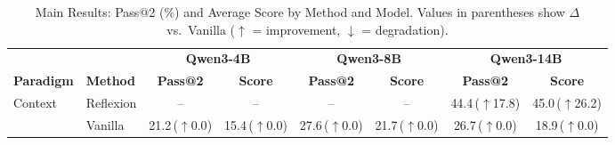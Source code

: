 \begin{table}[t]
  \centering
  \small
  \caption{Main Results: Pass@2 (\%) and Average Score by Method and Model. Values in parentheses show $\Delta$ vs.\ Vanilla ($\uparrow$ = improvement, $\downarrow$ = degradation).}
  \label{tab:main_results}
  \begin{tabular}{llcccccc}
  \toprule
  & & \multicolumn{2}{c}{\textbf{Qwen3-4B}} & \multicolumn{2}{c}{\textbf{Qwen3-8B}} & \multicolumn{2}{c}{\textbf{Qwen3-14B}} \\
  \cmidrule(lr){3-4} \cmidrule(lr){5-6} \cmidrule(lr){7-8}
  \textbf{Paradigm} & \textbf{Method} & \textbf{Pass@2} & \textbf{Score} & \textbf{Pass@2} & \textbf{Score} & \textbf{Pass@2} & \textbf{Score} \\
  \midrule
  \multirow{2}{*}{Context} & Reflexion & -- & -- & -- & -- & \cellcolor[HTML]{4284B9}44.4\,({\scriptsize $\uparrow$17.8}) & \cellcolor[HTML]{4083B8}45.0\,({\scriptsize $\uparrow$26.2}) \\
   & Vanilla & \cellcolor[HTML]{A5C7E2}21.2\,({\scriptsize $\uparrow$0.0}) & \cellcolor[HTML]{C2D9EC}15.4\,({\scriptsize $\uparrow$0.0}) & \cellcolor[HTML]{85B3D6}27.6\,({\scriptsize $\uparrow$0.0}) & \cellcolor[HTML]{A3C6E2}21.7\,({\scriptsize $\uparrow$0.0}) & \cellcolor[HTML]{8AB6D8}26.7\,({\scriptsize $\uparrow$0.0}) & \cellcolor[HTML]{B1CEE6}18.9\,({\scriptsize $\uparrow$0.0}) \\
  \bottomrule
  \end{tabular}
\end{table}
